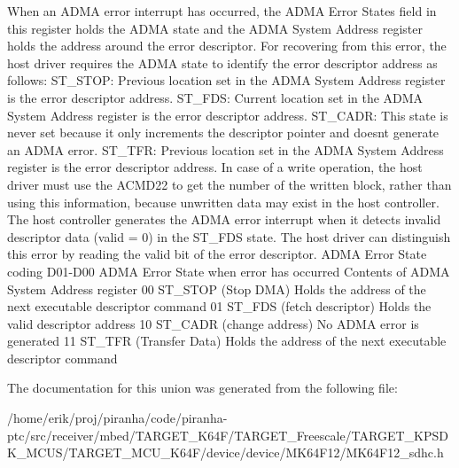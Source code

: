 When an A\+D\+MA error interrupt has occurred, the A\+D\+MA Error States field in this register holds the A\+D\+MA state and the A\+D\+MA System Address register holds the address around the error descriptor. For recovering from this error, the host driver requires the A\+D\+MA state to identify the error descriptor address as follows\+: S\+T\+\_\+\+S\+T\+OP\+: Previous location set in the A\+D\+MA System Address register is the error descriptor address. S\+T\+\_\+\+F\+DS\+: Current location set in the A\+D\+MA System Address register is the error descriptor address. S\+T\+\_\+\+C\+A\+DR\+: This state is never set because it only increments the descriptor pointer and doesn\textquotesingle{}t generate an A\+D\+MA error. S\+T\+\_\+\+T\+FR\+: Previous location set in the A\+D\+MA System Address register is the error descriptor address. In case of a write operation, the host driver must use the A\+C\+M\+D22 to get the number of the written block, rather than using this information, because unwritten data may exist in the host controller. The host controller generates the A\+D\+MA error interrupt when it detects invalid descriptor data (valid = 0) in the S\+T\+\_\+\+F\+DS state. The host driver can distinguish this error by reading the valid bit of the error descriptor. A\+D\+MA Error State coding D01-\/\+D00 A\+D\+MA Error State when error has occurred Contents of A\+D\+MA System Address register 00 S\+T\+\_\+\+S\+T\+OP (Stop D\+MA) Holds the address of the next executable descriptor command 01 S\+T\+\_\+\+F\+DS (fetch descriptor) Holds the valid descriptor address 10 S\+T\+\_\+\+C\+A\+DR (change address) No A\+D\+MA error is generated 11 S\+T\+\_\+\+T\+FR (Transfer Data) Holds the address of the next executable descriptor command 

The documentation for this union was generated from the following file\+:\begin{DoxyCompactItemize}
\item 
/home/erik/proj/piranha/code/piranha-\/ptc/src/receiver/mbed/\+T\+A\+R\+G\+E\+T\+\_\+\+K64\+F/\+T\+A\+R\+G\+E\+T\+\_\+\+Freescale/\+T\+A\+R\+G\+E\+T\+\_\+\+K\+P\+S\+D\+K\+\_\+\+M\+C\+U\+S/\+T\+A\+R\+G\+E\+T\+\_\+\+M\+C\+U\+\_\+\+K64\+F/device/device/\+M\+K64\+F12/M\+K64\+F12\+\_\+sdhc.\+h\end{DoxyCompactItemize}
